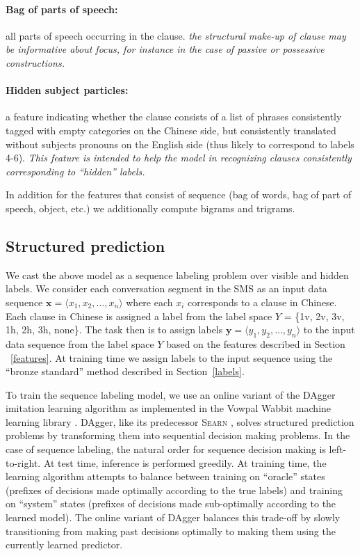 \documentclass[11pt]{report}
\renewcommand{\vec}[1]{\boldsymbol{#1}}
\begin{document}
\paragraph{Bag of parts of speech:} all parts of speech occurring in the clause.   \emph{the structural make-up of clause may be informative about focus, for instance in the case of passive or possessive constructions.}
\vspace{-0.5em}

\paragraph{Hidden subject particles:} a feature indicating whether the clause consists of a list of phrases consistently tagged with empty categories on the Chinese side, but consistently translated without subjects pronouns on the English side (thus likely to correspond to labels 4-6).   \emph{This feature is intended to help the model in recognizing clauses consistently corresponding to ``hidden'' labels.}

In addition for the features that consist of sequence (bag of words, bag of part of speech, object, etc.) we additionally compute bigrams and trigrams.

\subsection{Structured prediction}

We cast the above model as a sequence labeling problem over visible and hidden labels. We consider each conversation segment in the SMS as an input data sequence $\vec x = \langle x_1, x_2, \dots, x_n\rangle$ where each $x_i$ corresponds to a clause in Chinese. Each clause in Chinese is assigned a label from the label space $Y$ = \{1v, 2v, 3v, 1h, 2h, 3h, none\}. The task then is to assign labels $\vec y = \langle y_1, y_2, \dots, y_n\rangle$ to the input data sequence from the label space $Y$ based on the features described in Section ~\ref{features}. At training time we assign labels to the input sequence using the ``bronze standard'' method described in Section~\ref{labels}.

To train the sequence labeling model, we use an online variant of the DAgger imitation learning algorithm \cite{ross11dagger} as implemented in the Vowpal Wabbit machine learning library \cite{langford2007vowpal,daume2014efficient}. DAgger, like its predecessor \textsc{Searn} \cite{daume2009search}, solves structured prediction problems by transforming them into sequential decision making problems. In the case of sequence labeling, the natural order for sequence decision making is left-to-right. At test time, inference is performed greedily. At training time, the learning algorithm attempts to balance between training on ``oracle'' states (prefixes of decisions made optimally according to the true labels) and training on ``system'' states (prefixes of decisions made sub-optimally according to the learned model). The online variant of DAgger balances this trade-off by slowly transitioning from making past decisions optimally to making them using the currently learned predictor.
\end{document}
